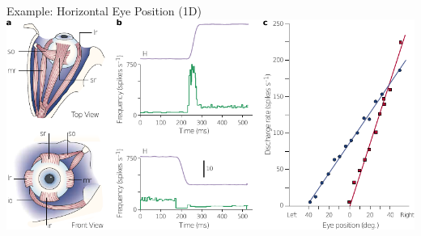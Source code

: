 \documentclass[handout,aspectratio=169]{beamer}
\begin{document}
\begin{frame}{Example: Horizontal Eye Position (1D)}
	\includegraphics[width=\textwidth]{media/sparks_et_al_2002_brainstem_eye.pdf}
\end{frame}
\end{document}
